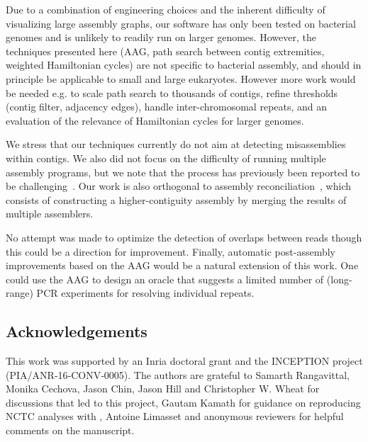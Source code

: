\documentclass[./main.tex]{subfiles}
\newcommand{\modafterreview}[1]{#1}
\begin{document}
Due to a combination of engineering choices and the inherent difficulty of visualizing large assembly graphs, our software has only been tested on bacterial genomes and is unlikely to readily run on larger genomes. However, the techniques presented here (AAG, path search between contig extremities, weighted Hamiltonian cycles) are not specific to bacterial assembly, and should in principle be applicable to small and large eukaryotes. 
However more work would be needed e.g. to scale path search to thousands of contigs, refine thresholds (contig filter, adjacency edges), handle inter-chromosomal repeats, and \modafterreview{an evaluation of the relevance of Hamiltonian cycles for larger genomes}.

We stress that our techniques currently do not aim at detecting misassemblies within contigs. We also did not focus on the difficulty of running multiple assembly programs, but we note that the process has previously been reported to be challenging~\citep{Lariviere347625}. %
Our work is also orthogonal to assembly reconciliation~\citep{alhakami2017comparative}, which consists of constructing a higher-contiguity assembly by merging the results of multiple assemblers.

No attempt was made to \modafterreview{optimize the detection of} overlaps between reads %
though \modafterreview{this could be} a direction for improvement. 
Finally, automatic post-assembly improvements based on the AAG would be a natural extension of this work. \modafterreview{One could use the AAG to design an oracle that suggests a limited number of (long-range) PCR experiments for resolving individual repeats.} 


\subsection*{Acknowledgements}

This work was supported by an Inria doctoral grant and the INCEPTION project (PIA/ANR‐16‐CONV‐0005). The authors are grateful to Samarth Rangavittal, Monika Cechova, Jason Chin, Jason Hill and Christopher W. Wheat for discussions that led to this project,  Gautam Kamath for guidance on reproducing NCTC analyses with \hinge, Antoine Limasset and anonymous reviewers for helpful comments on the manuscript.
\end{document}
